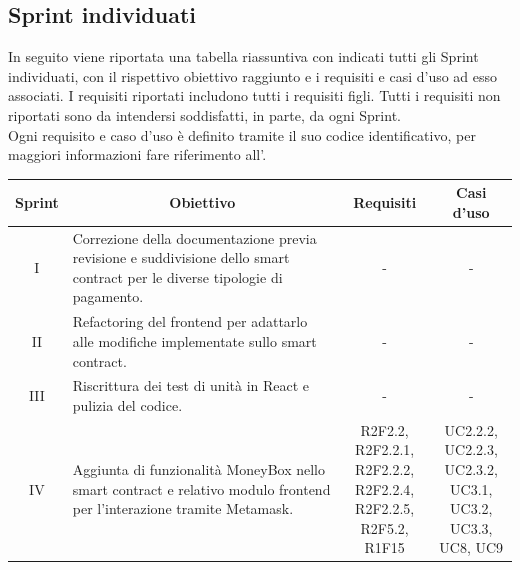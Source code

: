 \subsection{Sprint individuati} \label{subsection:sprint}
In seguito viene riportata una tabella riassuntiva con indicati tutti gli Sprint\glo{} individuati, con il rispettivo obiettivo raggiunto e i requisiti e casi d'uso ad esso associati.
I requisiti riportati includono tutti i requisiti figli. Tutti i requisiti non riportati sono da intendersi soddisfatti, in parte, da
ogni Sprint\glo{}. \\
Ogni requisito e caso d'uso è definito tramite il suo codice identificativo, per maggiori informazioni fare riferimento all'\docNameVersionAdR{}.

\begin{table}[H]
  \centering
  \renewcommand{\arraystretch}{1.8}
  \begin{tabular}{c|p{6cm}|c|c}
    \rowcolor[HTML]{125E28}
    \color[HTML]{FFFFFF}\textbf{Sprint}
        & \multicolumn{1}{c}{\color[HTML]{FFFFFF}\textbf{Obiettivo}}
        & \multicolumn{1}{c}{\color[HTML]{FFFFFF}\textbf{Requisiti}}
        & \multicolumn{1}{c}{\color[HTML]{FFFFFF}\textbf{Casi d'uso}}                                                                                                                            \\
    \hline
    I   & Correzione della documentazione previa revisione \RTB{} e suddivisione dello smart contract\glo{} per le diverse tipologie di pagamento.      & -                                  & - \\
    II  & Refactoring\glo{} del frontend\glo{} per adattarlo alle modifiche implementate sullo smart contract\glo{}.                                    & -                                  & - \\
    III & Riscrittura dei test di unità in React\glo{} e pulizia del codice.                                                                            & -                                  & - \\
    IV  & Aggiunta di funzionalità MoneyBox\glo{} nello smart contract\glo{} e relativo modulo frontend\glo{} per l'interazione tramite Metamask\glo{}. & \Shortunderstack{R2F2.2, R2F2.2.1,     \\R2F2.2.2, R2F2.2.4,\\R2F2.2.5, R2F5.2,\\R1F15\\} & \Shortunderstack{UC2.2.2, UC2.2.3,\\UC2.3.2, UC3.1,\\UC3.2, UC3.3,\\UC8, UC9\\}\\

\end{tabular}
\end{table}
